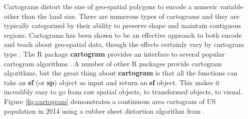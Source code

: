 \documentclass[
  12pt,
]{krantz}
\newenvironment{Shaded}{\begin{snugshade}}{\end{snugshade}}
\newcommand{\CharTok}[1]{\textcolor[rgb]{0.31,0.60,0.02}{#1}}
\newcommand{\DataTypeTok}[1]{\textcolor[rgb]{0.13,0.29,0.53}{#1}}
\newcommand{\DecValTok}[1]{\textcolor[rgb]{0.00,0.00,0.81}{#1}}
\newcommand{\KeywordTok}[1]{\textcolor[rgb]{0.13,0.29,0.53}{\textbf{#1}}}
\newcommand{\NormalTok}[1]{#1}
\newcommand{\OperatorTok}[1]{\textcolor[rgb]{0.81,0.36,0.00}{\textbf{#1}}}
\newcommand{\OtherTok}[1]{\textcolor[rgb]{0.56,0.35,0.01}{#1}}
\newcommand{\StringTok}[1]{\textcolor[rgb]{0.31,0.60,0.02}{#1}}
\begin{document}
Cartograms distort the size of geo-spatial polygons to encode a numeric variable other than the land size. There are numerous types of cartograms and they are typically categorized by their ability to preserve shape and maintain contiguous regions. Cartograms has been shown to be an effective approach to both encode and teach about geo-spatial data, though the effects certainly vary by cartogram type \citep{cartogram-vis}.
The R package \textbf{cartogram} provides an interface to several popular cartogram algorithms \citep{cartogram}. A number of other R packages provide cartogram algorithms, but the great thing about \textbf{cartogram} is that all the functions can take an \textbf{sf} (or \textbf{sp}) object as input and return an \textbf{sf} object. This makes it incredibly easy to go from raw spatial objects, to transformed objects, to visual. Figure \ref{fig:cartogram} demonstrates a continuous area cartogram of US population in 2014 using a rubber sheet distortion algorithm from \citet{Dougenik}.

\begin{Shaded}
\end{Shaded}
\end{document}
